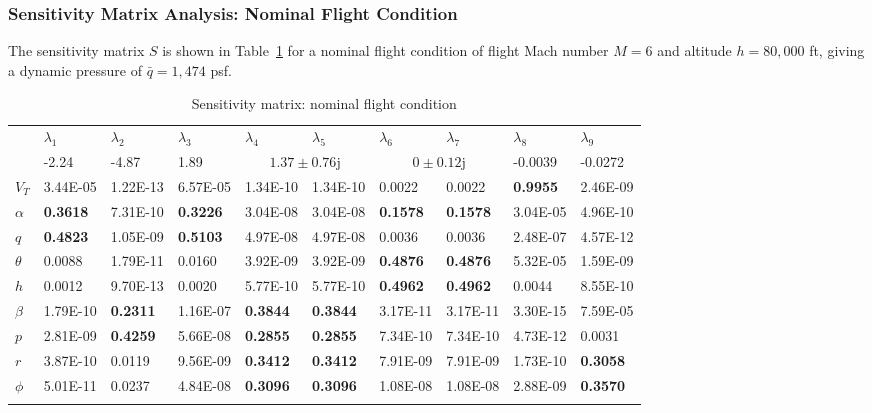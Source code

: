 \subsubsection*{Sensitivity Matrix Analysis: Nominal Flight Condition}

The sensitivity matrix $S$ is shown in Table~\ref{sensmat_fc1_1} for a nominal flight condition of flight Mach number $M=6$ and altitude $h=80,000$ ft, giving a dynamic pressure of $\bar{q}=1,474$ psf.

\begin{table}[H]
  \centering
  \caption{Sensitivity matrix: nominal flight condition}
  \fontsize{8pt}{8pt}\selectfont
  \begin{tabularx}{0.95\textwidth}{|X|XXXXX|XXXX|} %
    \cline{2-10}
    \multicolumn{1}{c|}{} & $\lambda_{1}$ & $\lambda_{2}$ & $\lambda_{3}$ & $\lambda_{4}$ & $\lambda_{5}$ & $\lambda_{6}$ & $\lambda_{7}$ & $\lambda_{8}$ & $\lambda_{9}$ \\
    \multicolumn{1}{c|}{} &  -2.24 & -4.87 & 1.89 & \multicolumn{2}{c|}{$1.37\pm 0.76\mathrm{j}$} & \multicolumn{2}{c}{$0\pm 0.12\mathrm{j}$} & -0.0039 & -0.0272 \\
    \hline %
    $V_{T}$ & 3.44E-05 & 1.22E-13 & 6.57E-05 & 1.34E-10 & 1.34E-10 & 0.0022 & 0.0022 & \textbf{0.9955} & 2.46E-09 \\ \hline %
    $\alpha$ & \textbf{0.3618} & 7.31E-10 & \textbf{0.3226} & 3.04E-08 & 3.04E-08 & \textbf{0.1578} & \textbf{0.1578} & 3.04E-05 & 4.96E-10 \\
    $q$     & \textbf{0.4823} & 1.05E-09 & \textbf{0.5103} & 4.97E-08 & 4.97E-08 & 0.0036 & 0.0036 & 2.48E-07 & 4.57E-12 \\
    $\theta$ & 0.0088 & 1.79E-11 & 0.0160 & 3.92E-09 & 3.92E-09 & \textbf{0.4876} & \textbf{0.4876} & 5.32E-05 & 1.59E-09 \\
    $h$     & 0.0012 & 9.70E-13 & 0.0020 & 5.77E-10 & 5.77E-10 & \textbf{0.4962} & \textbf{0.4962} & 0.0044 & 8.55E-10 \\ \hline %
    $\beta$ & 1.79E-10 & \textbf{0.2311} & 1.16E-07 & \textbf{0.3844} & \textbf{0.3844} & 3.17E-11 & 3.17E-11 & 3.30E-15 & 7.59E-05 \\
    $p$     & 2.81E-09 & \textbf{0.4259} & 5.66E-08 & \textbf{0.2855} & \textbf{0.2855} & 7.34E-10 & 7.34E-10 & 4.73E-12 & 0.0031 \\
    $r$     & 3.87E-10 & 0.0119 & 9.56E-09 & \textbf{0.3412} & \textbf{0.3412} & 7.91E-09 & 7.91E-09 & 1.73E-10 & \textbf{0.3058} \\
    $\phi$ & 5.01E-11 & 0.0237 & 4.84E-08 & \textbf{0.3096} & \textbf{0.3096} & 1.08E-08 & 1.08E-08 & 2.88E-09 & \textbf{0.3570} \\
    \lasthline%
  \end{tabularx}\label{sensmat_fc1_1}
\end{table}
